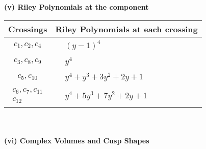 \documentclass[1p]{elsarticle_modified}
\theoremstyle{definition}
\begin{document}
\newpage\renewcommand{\arraystretch}{1}
\flushleft \textbf{(v) Riley Polynomials at the component}\newline \\
\begin{tabular}{m{50pt}|m{274pt}}
Crossings & \hspace{64pt}Riley Polynomials at each crossing \\
\hline $$\begin{aligned}c_{1},c_{2},c_{4}\end{aligned}$$&$\begin{aligned}
&(y-1)^4
\end{aligned}$\\
\hline $$\begin{aligned}c_{3},c_{8},c_{9}\end{aligned}$$&$\begin{aligned}
&y^4
\end{aligned}$\\
\hline $$\begin{aligned}c_{5},c_{10}\end{aligned}$$&$\begin{aligned}
&y^4+y^3+3 y^2+2 y+1
\end{aligned}$\\
\hline $$\begin{aligned}c_{6},c_{7},c_{11}\\c_{12}\end{aligned}$$&$\begin{aligned}
&y^4+5 y^3+7 y^2+2 y+1
\end{aligned}$\\
\hline
\end{tabular}\\~\\
\newpage\flushleft \textbf{(vi) Complex Volumes and Cusp Shapes}
\end{document}
